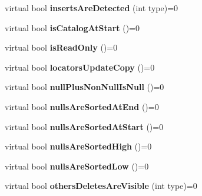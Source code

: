 \begin{DoxyCompactItemize}
\item 
\hypertarget{classsql_1_1_database_meta_data_a21d652b192599e0574361b0acdb1def8}{}\label{classsql_1_1_database_meta_data_a21d652b192599e0574361b0acdb1def8} 
virtual bool {\bfseries inserts\+Are\+Detected} (int type)=0
\item 
\hypertarget{classsql_1_1_database_meta_data_a883835fd1bab9b119c4f597e56828687}{}\label{classsql_1_1_database_meta_data_a883835fd1bab9b119c4f597e56828687} 
virtual bool {\bfseries is\+Catalog\+At\+Start} ()=0
\item 
\hypertarget{classsql_1_1_database_meta_data_a3b49f4c71b9589c73d1c73fc05ccedea}{}\label{classsql_1_1_database_meta_data_a3b49f4c71b9589c73d1c73fc05ccedea} 
virtual bool {\bfseries is\+Read\+Only} ()=0
\item 
\hypertarget{classsql_1_1_database_meta_data_a3d99b0398c99d00af3ee7866e24b5287}{}\label{classsql_1_1_database_meta_data_a3d99b0398c99d00af3ee7866e24b5287} 
virtual bool {\bfseries locators\+Update\+Copy} ()=0
\item 
\hypertarget{classsql_1_1_database_meta_data_a92cce4e529c70dc4108da4a862fbc813}{}\label{classsql_1_1_database_meta_data_a92cce4e529c70dc4108da4a862fbc813} 
virtual bool {\bfseries null\+Plus\+Non\+Null\+Is\+Null} ()=0
\item 
\hypertarget{classsql_1_1_database_meta_data_a9eddeb9a9624aaf08add52b25fed99e2}{}\label{classsql_1_1_database_meta_data_a9eddeb9a9624aaf08add52b25fed99e2} 
virtual bool {\bfseries nulls\+Are\+Sorted\+At\+End} ()=0
\item 
\hypertarget{classsql_1_1_database_meta_data_a14804cc7855e536d06e6e4e958638745}{}\label{classsql_1_1_database_meta_data_a14804cc7855e536d06e6e4e958638745} 
virtual bool {\bfseries nulls\+Are\+Sorted\+At\+Start} ()=0
\item 
\hypertarget{classsql_1_1_database_meta_data_a71e0e231ef14252538014a37779b1bef}{}\label{classsql_1_1_database_meta_data_a71e0e231ef14252538014a37779b1bef} 
virtual bool {\bfseries nulls\+Are\+Sorted\+High} ()=0
\item 
\hypertarget{classsql_1_1_database_meta_data_a4043cd2e87dff21d4a235115bddfa675}{}\label{classsql_1_1_database_meta_data_a4043cd2e87dff21d4a235115bddfa675} 
virtual bool {\bfseries nulls\+Are\+Sorted\+Low} ()=0
\item 
\hypertarget{classsql_1_1_database_meta_data_a718aadd6d991022955fcf709a7015b01}{}\label{classsql_1_1_database_meta_data_a718aadd6d991022955fcf709a7015b01} 
virtual bool {\bfseries others\+Deletes\+Are\+Visible} (int type)=0
\item 

\end{DoxyCompactItemize}
